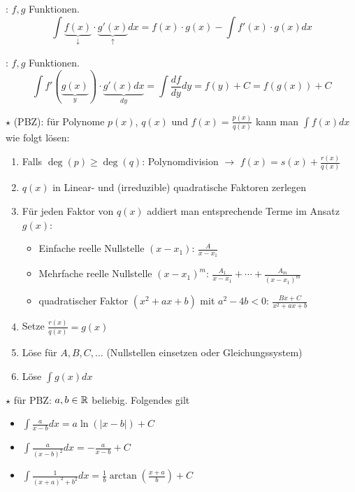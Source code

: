 \Satz {}: $f, g$ Funktionen.
$$\int \underbrace{f(x)}_{\downarrow}\cdot\underbrace{g'(x)}_{\uparrow} dx = f(x) \cdot g(x) - \int f'(x) \cdot g(x) dx$$

\Satz {}: $f, g$ Funktionen.
$$\int f'(\underbrace{g(x)}_y) \cdot \underbrace{g'(x) dx}_{dy} = \int \frac{df}{dy} dy = f(y) + C = f(g(x)) + C$$

\Satz $\star$  (PBZ): für Polynome $p(x)$, $q(x)$ und $f(x) = \frac{p(x)}{q(x)}$
kann man $\displaystyle \int f(x) dx$ wie folgt lösen:
\vspace{-0.6em}
\begin{enumerate}
    \item Falls $\deg(p) \ge \deg(q)$: Polynomdivision $\to$ $f(x) = s(x) + \frac{r(x)}{q(x)}$
    \item $q(x)$ in Linear- und (irreduzible) quadratische Faktoren zerlegen
    \item Für jeden Faktor von $q(x)$ addiert man entsprechende Terme im Ansatz $g(x)$:
    \begin{itemize}
        \item Einfache reelle Nullstelle $(x - x_1)$: $\frac{A}{x - x_1}$
        \item Mehrfache reelle Nullstelle $(x -x_1)^m$: $\frac{A_1}{x - x_1} + \cdots + \frac{A_m}{(x - x_1)^m}$
        \item quadratischer Faktor $(x^2 + ax + b)$ mit $a^2 - 4b < 0$: $\frac{Bx + C}{x^2 + ax + b}$
    \end{itemize}
    \item Setze $\frac{r(x)}{q(x)} = g(x)$
    \item Löse für $A, B, C, \ldots$ (Nullstellen einsetzen oder Gleichungssystem)
    \item Löse $\displaystyle \int g(x) dx$
\end{enumerate}

\Satz $\star$  für PBZ: $a, b \in \mathbb{R}$ beliebig. Folgendes gilt
\vspace{-0.6em}
\begin{itemize}
    \item $\displaystyle \int \frac{a}{x - b} dx = a \ln(|x - b|) + C$
    \item $\displaystyle \int \frac{a}{(x - b)^2} dx = -\frac{a}{x-b} + C$
    \item $\displaystyle \int \frac{1}{(x + a)^2 + b^2} dx = \frac{1}{b} \arctan(\frac{x + a}{b}) + C$
\end{itemize}


